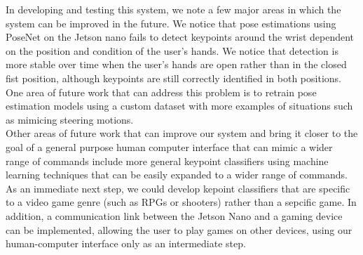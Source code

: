 \documentclass[10pt,twocolumn,letterpaper]{article}
\begin{document}
In developing and testing this system, we note a few major areas in which the system can 
be improved in the future. We notice that pose estimations using PoseNet on the Jetson nano 
fails to detect keypoints around the wrist dependent on the position and condition of the user's 
hands. We notice that detection is more stable over time when the user's hands are open rather than in the 
closed fist position, although keypoints are still correctly identified in both positions. One 
area of future work that can address this problem is to retrain pose estimation models using a 
custom dataset with more examples of situations such as mimicing steering motions.\\

Other areas of future work that can improve our system and bring it closer to the goal of a 
general purpose human computer interface that can mimic a wider range of commands include more 
general keypoint classifiers using machine learning techniques that can be easily expanded 
to a wider range of commands. As an immediate next step, we could develop kepoint classifiers that are specific to a video game genre (such as RPGs or shooters) rather than a sepcific game.
In addition, a communication link between the Jetson Nano and 
a gaming device can be implemented, allowing the user to play games on other devices, using our 
human-computer interface only as an intermediate step.

{\small


}
\end{document}
